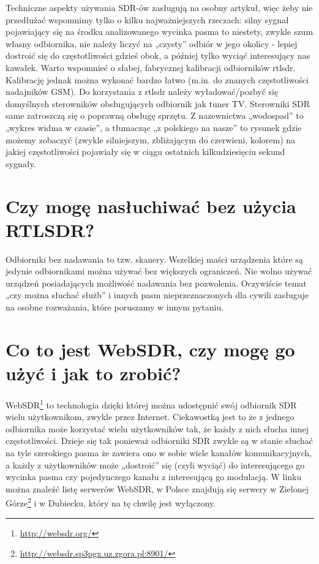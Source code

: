 \documentclass[a4paper,12pt]{article}
\begin{document}
Techniczne aspekty używania SDR-ów zasługują na osobny artykuł, więc żeby nie przedłużać wspomnimy tylko o kilku najważniejszych rzeczach: silny sygnał pojawiający się na środku analizowanego wycinka pasma to niestety, zwykle szum własny odbiornika, nie należy liczyć na „czysty” odbiór w jego okolicy - lepiej dostroić się do częstotliwości gdzieś obok, a później tylko wyciąć interesujący nas kawałek. Warto wspomnieć o słabej, fabrycznej kalibracji odbiorników rtlsdr. Kalibrację jednak można wykonać bardzo łatwo (m.in. do znanych częstotliwości nadajników GSM). Do korzystania z rtlsdr należy wyładować/pozbyć się domyślnych sterowników obsługujących odbiornik jak tuner TV. Sterowniki SDR same zatroszczą się o poprawną obsługę sprzętu.
Z nazewnictwa „wodospad” to „wykres widma w czasie”, a tłumacząc „z polskiego na nasze” to rysunek gdzie możemy zobaczyć (zwykle silniejszym, zbliżającym do czerwieni, kolorem) na jakiej częstotliwości pojawiały się w ciągu ostatnich kilkudziesięciu sekund sygnały.

\section{Czy mogę nasłuchiwać bez użycia RTLSDR?}
Odbiorniki bez nadawania to tzw. skanery. Wszelkiej maści urządzenia które są jedynie odbiornikami można używać bez większych ograniczeń. Nie wolno używać urządzeń posiadających możliwość nadawania bez pozwolenia. Oczywiście temat „czy można słuchać służb” i innych pasm nieprzeznaczonych dla cywili zasługuje na osobne rozważania, które poruszamy w innym pytaniu.

\section{Co to jest WebSDR, czy mogę go użyć i jak to zrobić?}
WebSDR\footnote{\url{http://websdr.org/}} to technologia dzięki której można udostępnić swój odbiornik SDR wielu użytkownikom, zwykle przez Internet. Ciekawostką jest to że z jednego odbiornika może korzystać wielu użytkowników tak, że każdy z nich słucha innej częstotliwości. Dzieje się tak ponieważ odbiorniki SDR zwykle są w stanie słuchać na tyle szerokiego pasma że zawiera ono w sobie wiele kanałów komunikacyjnych, a każdy z użytkowników może „dostroić” się (czyli wyciąć) do interesującego go wycinka pasma czy pojedynczego kanału z interesującą go modulacją. W linku można znaleźć listę serwerów WebSDR, w Polsce znajdują się serwery w Zielonej Górze\footnote{\url{http://websdr.sp3pgx.uz.zgora.pl:8901/}} i w Dubiecku, który na tę chwilę jest wyłączony.
\end{document}
